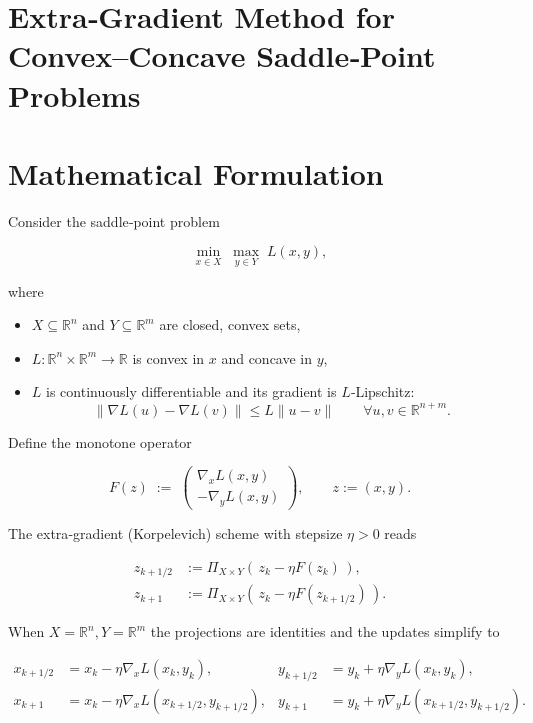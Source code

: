 \documentclass{article}
\newcommand{\proj}[2]{\Pi_{#1}\!\left(#2\right)}
\newcommand{\R}{\mathbb{R}}
\begin{document}
\section*{Extra‑Gradient Method for Convex–Concave Saddle‑Point Problems}

\section*{Mathematical Formulation}
Consider the saddle‑point problem  

\[
\min_{x\in X}\;\max_{y\in Y}\;L(x,y),
\]

where  

\begin{itemize}
  \item $X\subseteq\R^{n}$ and $Y\subseteq\R^{m}$ are closed, convex sets,
  \item $L:\R^{n}\times\R^{m}\rightarrow\R$ is convex in $x$ and concave in $y$,
  \item $L$ is continuously differentiable and its gradient is $L$‑Lipschitz:
  \[
  \|\nabla L(u)-\nabla L(v)\| \le L\|u-v\|\qquad\forall u,v\in\R^{n+m}.
  \]
\end{itemize}

Define the monotone operator  

\[
F(z)\;:=\;
\begin{pmatrix}
\nabla_{x}L(x,y)\\[2mm]
-\nabla_{y}L(x,y)
\end{pmatrix},
\qquad z:=(x,y).
\]

The extra‑gradient (Korpelevich) scheme with stepsize $\eta>0$ reads  

\[
\begin{aligned}
z_{k+1/2}&:=\proj{X\times Y}{\,z_{k}-\eta F(z_{k})\,},\\[1mm]
z_{k+1}&:=\proj{X\times Y}{\,z_{k}-\eta F(z_{k+1/2})\,}.
\end{aligned}
\tag{EG}
\]

When $X=\R^{n},Y=\R^{m}$ the projections are identities and the updates simplify to  

\[
\begin{aligned}
x_{k+1/2}&=x_{k}-\eta \nabla_{x}L(x_{k},y_{k}), &
y_{k+1/2}&=y_{k}+ \eta \nabla_{y}L(x_{k},y_{k}),\\[1mm]
x_{k+1}&=x_{k}-\eta \nabla_{x}L(x_{k+1/2},y_{k+1/2}), &
y_{k+1}&=y_{k}+ \eta \nabla_{y}L(x_{k+1/2},y_{k+1/2}).
\end{aligned}
\tag{1}
\]
\end{document}
